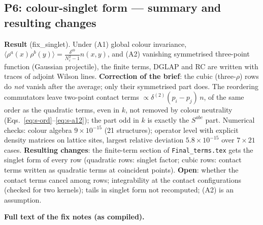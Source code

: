 \documentclass[10pt]{article}
\begin{document}
\subsection{P6: colour-singlet form --- summary and resulting changes}\label{sec:fix-singlet}
\noindent\textbf{Result} (fix\_singlet). Under (A1) global colour invariance, $\langle\rho^{a}(x)\rho^{b}(y)\rangle=\frac{\delta^{ab}}{N_{c}^{2}-1}n(x,y)$, and (A2) vanishing symmetrised three-point function (Gaussian projectile), the finite terms, DGLAP and RC are written with traces of adjoint Wilson lines. \textbf{Correction of the brief}: the cubic (three-$\rho$) rows do \emph{not} vanish after the average; only their symmetrised part does. The reordering commutators leave two-point contact terms $\propto\delta^{(2)}(p_{i}-p_{j})\,n$, of the same order as the quadratic terms, even in $k$, not removed by colour neutrality (Eqs.~\eqref{eq:s-ord}--\eqref{eq:s-a12}); the part odd in $k$ is exactly the $S^{abc}$ part. Numerical checks: colour algebra $9\times10^{-15}$ (21 structures); operator level with explicit density matrices on lattice sites, largest relative deviation $5.8\times10^{-15}$ over $7\times21$ cases. \textbf{Resulting changes}: the finite-term section of \texttt{Final\_terms.tex} gets the singlet form of every row (quadratic rows: singlet factor; cubic rows: contact terms written as quadratic terms at coincident points). \textbf{Open}: whether the contact terms cancel among rows; integrability at the contact configurations (checked for two kernels); tails in singlet form not recomputed; (A2) is an assumption.

\clearpage
\noindent\textbf{\large Full text of the fix notes (as compiled).}

\end{document}
